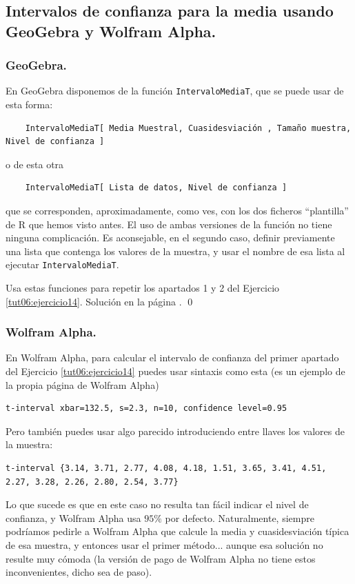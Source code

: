 \documentclass[10pt,a4paper]{article}\usepackage[]{graphicx}\usepackage[]{color}
\newcounter {cont01}
\begin{document}
\subsection{Intervalos de confianza para la media usando GeoGebra y Wolfram Alpha.}
\label{tut06:subsec:IntConfMediaUsandoTConGgbWolfram}


\subsubsection*{GeoGebra.}

En GeoGebra disponemos de la función {\tt IntervaloMediaT}, que se puede usar de esta forma:
{\small
\begin{verbatim}
    IntervaloMediaT[ Media Muestral, Cuasidesviación , Tamaño muestra, Nivel de confianza ]
\end{verbatim}
}
o de esta otra
{\small
\begin{verbatim}
    IntervaloMediaT[ Lista de datos, Nivel de confianza ]
\end{verbatim}
}
que se corresponden, aproximadamente, como ves, con los dos ficheros ``plantilla'' de R que hemos visto antes. El uso de ambas versiones de la función no tiene ninguna complicación. Es aconsejable, en el segundo caso, definir previamente una lista que contenga los valores de la muestra, y usar el nombre de esa lista al ejecutar {\tt IntervaloMediaT}.

\begin{ejercicio}
\label{tut06:ejercicio16}
Usa estas funciones para repetir los apartados 1 y 2 del Ejercicio \ref{tut06:ejercicio14}.
Solución en la página \pageref{tut06:ejercicio16:sol}.
\qed
\end{ejercicio}

\subsubsection*{Wolfram Alpha.}

En Wolfram Alpha, para calcular el intervalo de confianza del primer apartado del Ejercicio \ref{tut06:ejercicio14} puedes usar sintaxis como esta (es un ejemplo de la propia página de Wolfram Alpha)
\begin{verbatim}
t-interval xbar=132.5, s=2.3, n=10, confidence level=0.95
\end{verbatim}
Pero también puedes usar algo parecido introduciendo entre llaves los valores de la muestra:
{\small
\begin{verbatim}
t-interval {3.14, 3.71, 2.77, 4.08, 4.18, 1.51, 3.65, 3.41, 4.51, 2.27, 3.28, 2.26, 2.80, 2.54, 3.77}
\end{verbatim}
}
Lo que sucede es que en este caso no resulta tan fácil indicar el nivel de confianza, y Wolfram Alpha usa $95\%$ por defecto. Naturalmente, siempre podríamos pedirle a Wolfram Alpha que calcule la media y cuasidesviación típica de esa muestra, y entonces usar el primer método... aunque esa solución no resulte muy cómoda (la versión de pago de Wolfram Alpha no tiene estos inconvenientes, dicho sea de paso).
\end{document}
